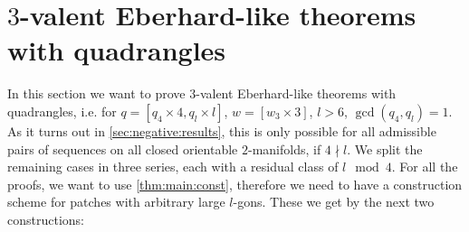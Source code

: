\section{$3$-valent {\sc Eberhard}-like theorems with quadrangles}

In this section we want to prove $3$-valent {\sc Eberhard}-like theorems with quadrangles, i.e. for $q = [q_4 \times 4, q_l \times l]$, $w = [w_3 \times 3]$, $l > 6$, $\gcd(q_4, q_l) = 1$. As it turns out in \autoref{sec:negative:results}, this is only possible for all admissible pairs of sequences on all closed orientable $2$-manifolds, if $4 \nmid l$. We split the remaining cases in three series, each with a residual class of $l \mod 4$. For all the proofs, we want to use \autoref{thm:main:const}, therefore we need to have a construction scheme for patches with arbitrary large $l$-gons. These we get by the next two constructions:

